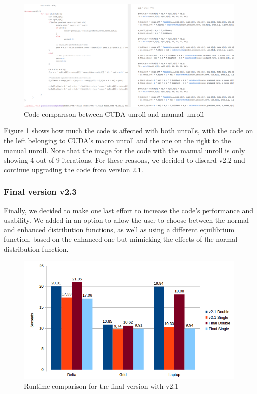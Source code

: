 \documentclass[12pt, openany]{book}
\begin{document}
   \begin{figure}[H]
   	\centering
   	\includegraphics[width=1.1\linewidth]{Resources/Images/unrollcode.png}
   	\caption{Code comparison between CUDA unroll and manual unroll}
   	\label{fig:unrollComp}
   \end{figure}

Figure \ref{fig:unrollComp} shows how much the code is affected with both unrolls, with the code on the left belonging to CUDA's macro unroll and the one on the right to the manual unroll. Note that the image for the code with the manual unroll is only showing 4 out of 9 iterations. For these reasons, we decided to discard v2.2 and continue upgrading the code from version 2.1.
\subsubsection{Final version v2.3}
Finally, we decided to make one last effort to increase the code's performance and usability. We added in an option to allow the user to choose between the normal and enhanced distribution functions, as well as using a different equilibrium function, based on the enhanced one but mimicking the effects of the normal distribution function. 

  \begin{figure}[H]
  	\centering
  	\includegraphics[width=\linewidth]{Resources/Images/vfv.png}
  	\caption{Runtime comparison for the final version with v2.1}
  	\label{fig:vfv}
  \end{figure}
  
\end{document}
